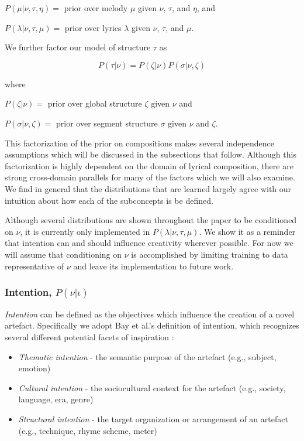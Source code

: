 \documentclass[letterpaper]{article}
\begin{document}
\(P(\mu|\nu,\tau,\eta)=\) prior over melody $\mu$ given $\nu$, $\tau$, and $\eta$, and

\(P(\lambda|\nu,\tau,\mu)=\) prior over lyrics $\lambda$ given $\nu$, $\tau$, and $\mu$.

We further factor our model of structure $\tau$ as

\[ P(\tau|\nu) = P(\zeta|\nu)P(\sigma|\nu,\zeta) \]

\noindent where 

\(P(\zeta|\nu)=\) prior over global structure $\zeta$ given $\nu$ and

\(P(\sigma|\nu,\zeta)=\) prior over segment structure $\sigma$ given $\nu$ and $\zeta$.

This factorization of the prior on compositions makes several independence assumptions which will be discussed in the subsections that follow. Although this factorization is highly dependent on the domain of lyrical composition, there are strong cross-domain parallels for many of the factors which we will also examine. We find in general that the distributions that are learned largely agree with our intuition about how each of the subconcepts is be defined.

Although several distributions are shown throughout the paper to be conditioned on $\nu$, it is currently only implemented in $P(\lambda|\nu,\tau,\mu)$. We show it as a reminder that intention can and should influence creativity wherever possible. For now we will assume that conditioning on $\nu$ is accomplished by limiting training to data representative of $\nu$ and leave its implementation to future work.

\subsubsection{Intention, $P(\nu|\iota)$}

\emph{Intention} can be defined as the objectives which influence the creation of a novel artefact. Specifically we adopt Bay et al.'s definition of intention, which recognizes several different potential facets of inspiration \cite{bay:inpress-a}:

\begin{itemize}  
\item \emph{Thematic intention} - the semantic purpose of the artefact (e.g., subject, emotion)
\item \emph{Cultural intention} - the sociocultural context for the artefact (e.g., society, language, era, genre)
\item \emph{Structural intention} - the target organization or arrangement of an artefact (e.g., technique, rhyme scheme, meter)
\end{itemize}
\end{document}
